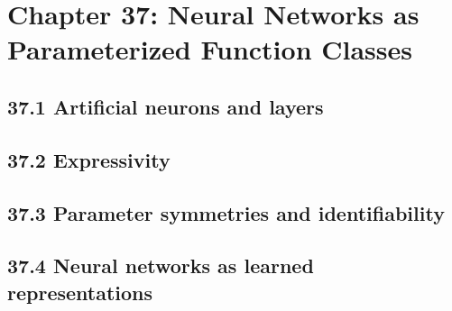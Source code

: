 \section{Chapter 37: Neural Networks as Parameterized Function Classes}

\subsection{37.1 Artificial neurons and layers}

\subsection{37.2 Expressivity}

\subsection{37.3 Parameter symmetries and identifiability}

\subsection{37.4 Neural networks as learned representations}

\clearpage
